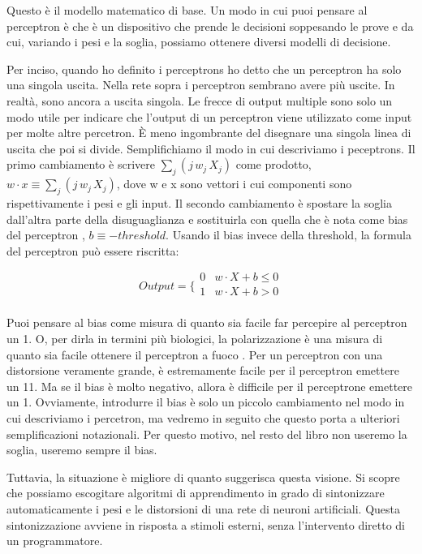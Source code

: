 Questo è il modello matematico di base. Un modo in cui puoi pensare al perceptron è che è un dispositivo che prende le decisioni soppesando le prove e da cui, variando i pesi e la soglia, possiamo ottenere diversi modelli di decisione.

Per inciso, quando ho definito i perceptrons ho detto che un perceptron ha solo una singola uscita. Nella rete sopra i perceptron sembrano avere più uscite. In realtà, sono ancora a uscita singola. Le frecce di output multiple sono solo un modo utile per indicare che l'output di un perceptron viene utilizzato come input per molte altre percetron. È meno ingombrante del disegnare una singola linea di uscita che poi si divide.
Semplifichiamo il modo in cui descriviamo i peceptrons.
Il primo cambiamento è scrivere $\sum_j ( j \, w_j \, X_j )$ come prodotto, 
$ w \cdot x \equiv \sum_j ( j \, w_j \, X_j )$, dove w e x sono vettori i cui componenti sono rispettivamente i pesi e gli input. Il secondo cambiamento è spostare la soglia dall'altra parte della disuguaglianza e sostituirla con quella che è nota come bias del perceptron , $b \equiv -threshold$. Usando il bias invece della threshold, la formula del perceptron può essere riscritta:

$$Output =
\bigg \{
\begin{array}{rl}
0 & w\cdot X + b \le 0 \\
1 & w\cdot X + b > 0 \\
\end{array}
$$


Puoi pensare al bias come misura di quanto sia facile far percepire al perceptron un 1. O, per dirla in termini più biologici, la polarizzazione è una misura di quanto sia facile ottenere il perceptron a fuoco . Per un perceptron con una distorsione veramente grande, è estremamente facile per il perceptron emettere un 11. Ma se il bias è molto negativo, allora è difficile per il perceptrone emettere un 1. Ovviamente, introdurre il bias è solo un piccolo cambiamento nel modo in cui descriviamo i percetron, ma vedremo in seguito che questo porta a ulteriori semplificazioni notazionali. Per questo motivo, nel resto del libro non useremo la soglia, useremo sempre il bias.

Tuttavia, la situazione è migliore di quanto suggerisca questa visione. Si scopre che possiamo escogitare algoritmi di apprendimento in grado di sintonizzare automaticamente i pesi e le distorsioni di una rete di neuroni artificiali. Questa sintonizzazione avviene in risposta a stimoli esterni, senza l'intervento diretto di un programmatore.




